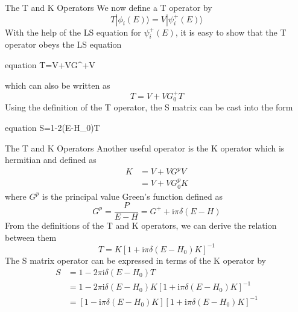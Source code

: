 \documentclass{beamer}
\begin{document}
	\begin{frame}{The T and K Operators}
		We now define a T operator by
		\begin{equation}
			T|\phi_i(E)\rangle=V|\psi_i^+(E)\rangle
		\end{equation}
		With the help of the LS equation for $\psi_i^+(E)$, it is easy to show that the T operator obeys the LS equation
		\begin{empheq}[box=\fbox]{equation}
			T=V+VG^+V
		\end{empheq}
		which can also be written as
		\begin{equation}
			T=V+VG_0^+T
		\end{equation}
		Using the definition of the T operator, the S matrix can be cast into the form
		\begin{empheq}[box=\fbox]{equation}
			S=1-2\pi{}\delta(E-H_0)T
		\end{empheq}
	\end{frame}
	\begin{frame}{The T and K Operators}
		Another useful operator is the K operator which is hermitian and defined as
		\begin{align}
			K&=V+VG^pV\nonumber\\
			&=V+VG_0^pK
		\end{align}
		where $G^p$ is the principal value Green's function defined as
		\begin{equation}
			G^p=\dfrac{P}{E-H}=G^++\mathrm{i}\pi\delta(E-H)
		\end{equation}
		From the definitions of the T and K operators, we can derive the relation between them
		\begin{equation}
			T=K[1+\mathrm{i}\pi\delta(E-H_0)K]^{-1}
		\end{equation}
		The S matrix operator can be expressed in terms of the K operator by
		\begin{align}
			S&=1-2\pi\mathrm{i}\delta(E-H_0)T\nonumber\\
			&=1-2\pi\mathrm{i}\delta(E-H_0)K[1+\mathrm{i}\pi\delta(E-H_0)K]^{-1}\nonumber\\
			&=[1-\mathrm{i}\pi\delta(E-H_0)K][1+\mathrm{i}\pi\delta(E-H_0)K]^{-1}
		\end{align}
	\end{frame}
\end{document}
